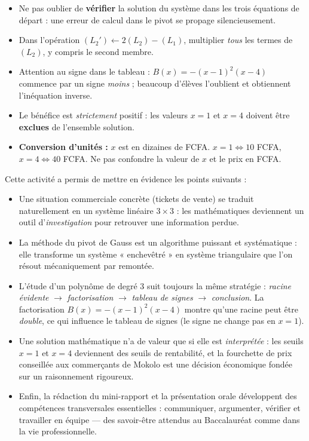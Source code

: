 \documentclass[11pt]{article}
\newcommand{\cle}[1]{{\popxbold\color{popdark}#1}}
\newcounter{popsec}
\newcounter{popsub}
\newcommand{\courssub}[1]{%
  \stepcounter{popsub}%
  \par\vspace{9pt}\noindent{\popxbold\fontsize{11.5}{13}\selectfont\color{popink}{\color{poporange}\thepopsec.\thepopsub}\hspace{6pt}#1}\par\nopagebreak\vspace{4pt}
}
\begin{document}
\begin{attention}
\begin{itemize}
\item Ne pas oublier de \textbf{vérifier} la solution du système dans les trois équations de départ : une erreur de calcul dans le pivot se propage silencieusement.
\item Dans l'opération $(L_2') \leftarrow 2(L_2) - (L_1)$, multiplier \emph{tous} les termes de $(L_2)$, y compris le second membre.
\item Attention au signe dans le tableau : $B(x) = -(x-1)^2(x-4)$ commence par un signe \emph{moins} ; beaucoup d'élèves l'oublient et obtiennent l'inéquation inverse.
\item Le bénéfice est \emph{strictement} positif : les valeurs $x = 1$ et $x = 4$ doivent être \textbf{exclues} de l'ensemble solution.
\item \textbf{Conversion d'unités :} $x$ est en dizaines de FCFA. $x=1 \Leftrightarrow 10$ FCFA, $x=4 \Leftrightarrow 40$ FCFA. Ne pas confondre la valeur de $x$ et le prix en FCFA.
\end{itemize}
\end{attention}

\courssub{Bilan de l'activité}

Cette activité a permis de mettre en évidence les points suivants :

\begin{itemize}
\item Une situation commerciale concrète (tickets de vente) se \cle{traduit} naturellement en un système linéaire $3\times 3$ : les mathématiques deviennent un outil d'\emph{investigation} pour retrouver une information perdue.
\item La méthode du \cle{pivot de Gauss} est un algorithme puissant et systématique : elle transforme un système « enchevêtré » en système triangulaire que l'on résout mécaniquement par remontée.
\item L'étude d'un polynôme de degré 3 suit toujours la même stratégie : \emph{racine évidente} $\rightarrow$ \emph{factorisation} $\rightarrow$ \emph{tableau de signes} $\rightarrow$ \emph{conclusion}. La factorisation $B(x) = -(x-1)^2(x-4)$ montre qu'une racine peut être \emph{double}, ce qui influence le tableau de signes (le signe ne change pas en $x = 1$).
\item Une solution mathématique n'a de valeur que si elle est \emph{interprétée} : les seuils $x = 1$ et $x = 4$ deviennent des seuils de rentabilité, et la fourchette de prix conseillée aux commerçants de Mokolo est une décision économique fondée sur un raisonnement rigoureux.
\item Enfin, la rédaction du mini-rapport et la présentation orale développent des compétences transversales essentielles : communiquer, argumenter, vérifier et travailler en équipe — des savoir-être attendus au Baccalauréat comme dans la vie professionnelle.
\end{itemize}
\end{document}
